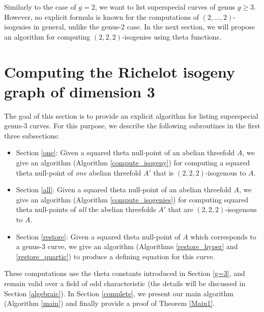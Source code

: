 \documentclass{amsart}
\theoremstyle{definition}
\theoremstyle{plain}
\begin{document}
Similarly to the case of $g=2$, we want to list superspecial curves of genus $g \geq 3$.
However, no explicit formula is known for the computations of $(2,\ldots,2)$-isogenies in general, unlike the genus-2 case.
In the next section, we will propose an algorithm for computing $(2,2,2)$-isogenies using theta functions.

\section{Computing the Richelot isogeny graph of dimension 3}\label{dim3}
The goal of this section is to provide an explicit algorithm for listing superspecial genus-3 curves.
For this purpose, we describe the following subroutines in the first three subsections:\smallskip
\begin{itemize}
\item[---] Section \ref{one}: Given a squared theta null-point of an abelian threefold $A$, we give an algorithm (Algorithm \ref{compute_isogeny}) for computing a squared theta null-point of \emph{one} abelian threefold $A'$ that is $(2,2,2)$-isogenous to $A$.\smallskip
\item[---] Section \ref{all}: Given a squared theta null-point of an abelian threefold $A$, we give an algorithm (Algorithm \ref{compute_isogenies}) for computing squared theta null-points of \emph{all} the abelian threefolds $A'$ that are $(2,2,2)$-isogenous to $A$.\smallskip
\item[---] Section \ref{restore}: Given a squared theta null-point of {$A$} which corresponds to a genus-3 curve, we give an algorithm (Algorithms \ref{restore_hyper} and \ref{restore_quartic}) to produce {a} defining equation for this curve.\smallskip
\end{itemize}
These computations use the theta constants introduced in Section \ref{g=3}, and remain valid over a field of odd characteristic (the details will be discussed in Section \ref{algebraic}).
In Section \ref{complete}, we present our main algorithm (Algorithm \ref{main}) and finally provide a proof of Theorem \ref{Main1}.
\end{document}
